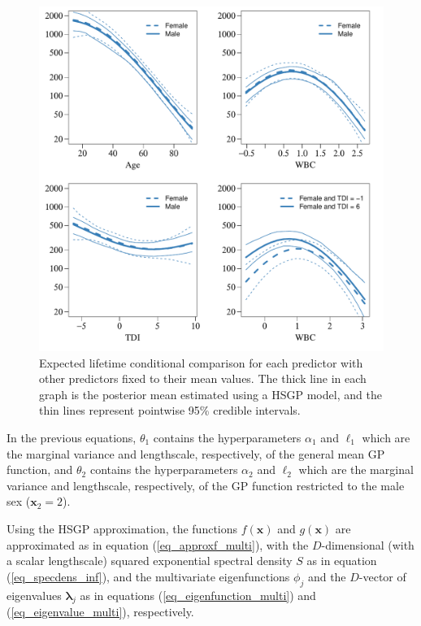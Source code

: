 \documentclass[onecolumn,a4paper,11pt]{article}
\begin{document}
\begin{figure}
\centering
\includegraphics[scale=0.70, trim = 0mm 0mm 0mm 0mm, clip]{ch5_fig21_posteriors_leukemia_02.pdf}
\caption{Expected lifetime conditional comparison for each predictor with other predictors fixed to their mean values. The thick line in each graph is the posterior mean estimated using a HSGP model, and the thin lines represent pointwise 95\% credible intervals.}
  \label{ch5_fig21_posteriors_leukemia}
\end{figure}

\noindent In the previous equations, $\theta_1$ contains the hyperparameters $\alpha_1$ and $\ell_1$ which are the marginal variance and lengthscale, respectively, of the general mean GP function, and $\theta_2$ contains the hyperparameters $\alpha_2$ and $\ell_2$ which are the marginal variance and lengthscale, respectively, of the GP function restricted to the male sex ($\bm{x}_2=2$).

Using the HSGP approximation, the functions $f(\bm{x})$ and $g(\bm{x})$ are approximated as in equation (\ref{eq_approxf_multi}), with the $D$-dimensional (with a scalar lengthscale) squared exponential spectral density $S$ as in equation (\ref{eq_specdens_inf}), and the multivariate eigenfunctions $\phi_j$ and the $D$-vector of eigenvalues $\bm{\lambda}_j$ as in equations (\ref{eq_eigenfunction_multi}) and  (\ref{eq_eigenvalue_multi}), respectively.
\end{document}
